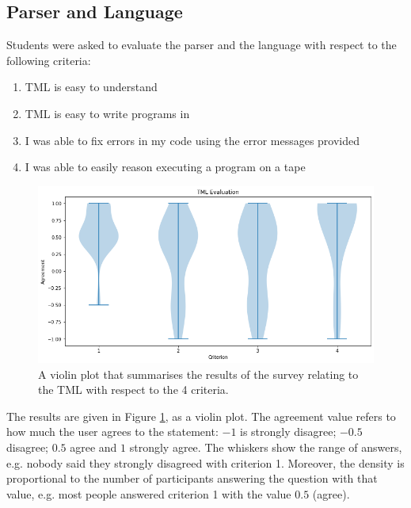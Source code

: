 \begin{appendices}
\subsection{Parser and Language}
Students were asked to evaluate the parser and the language with respect to the following criteria:
\begin{enumerate}
    \item TML is easy to understand
    \item TML is easy to write programs in
    \item I was able to fix errors in my code using the error messages provided
    \item I was able to easily reason executing a program on a tape
\end{enumerate}
\begin{figure}[htb]
    \centering
    \includegraphics[scale=0.3]{images/tml-evaluation.png}
    \caption{A violin plot that summarises the results of the survey relating to the TML with respect to the 4 criteria.}
    \label{fig:tml-evaluation}
\end{figure}
The results are given in Figure \ref{fig:tml-evaluation}, as a violin plot. The agreement value refers to how much the user agrees to the statement: $-1$ is strongly disagree; $-0.5$ disagree; $0.5$ agree and $1$ strongly agree. The whiskers show the range of answers, e.g. nobody said they strongly disagreed with criterion 1. Moreover, the density is proportional to the number of participants answering the question with that value, e.g. most people answered criterion 1 with the value $0.5$ (agree).


\end{appendices}
